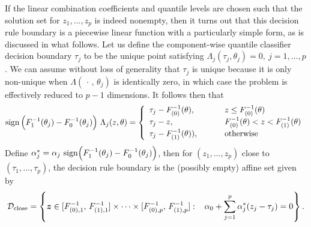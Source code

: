 If the linear combination coefficients and quantile levels are chosen such that
the solution set for $z_1, \dots, z_p$ is indeed nonempty, then it turns out
that this decision rule boundary is a piecewise linear function with a
particularly simple form, as is discussed in what follows.  Let us define the
component-wise quantile classifier decision boundary $\tau_j$ to be the unique
point satisfying $\Lambda_j (\tau_j, \theta_j) = 0,~ j = 1, \dots, p$.  We can
assume without loss of generality that $\tau_j$ is unique because it is only
non-unique when $\Lambda(\,\cdot\,,\, \theta_j)$ is identically zero, in which
case the problem is effectively reduced to $p - 1$ dimensions.  It follows then
that
\begin{equation}
  \label{eq:lambda}
  \sign\Big(F_1^{-1}(\theta_j) - F_0^{-1}(\theta_j)\Big)~ \Lambda_j(z, \theta) =
  \left\{
    \begin{array}{lll}
      \tau_j - F_{(0)}^{-1}(\theta),
      & \hspace{5mm}
      & z \leq F_{(0)}^{-1}(\theta) \\[0.5ex]
      \tau_j - z,
      & \hspace{5mm}
      & F_{(0)}^{-1}(\theta) < z < F_{(1)}^{-1}(\theta) \\[0.5ex]
      \tau_j - F_{(1)}^{-1} (\theta)),
      & \hspace{5mm}
      & \text{otherwise} \\
    \end{array}
  \right.
\end{equation}
Define
$\alpha_j^{*} = \alpha_j\, \operatorname{sign}\!\Big(F_1^{-1}(\theta_j) -
F_0^{-1}(\theta_j)\Big)$, then for $(z_1, \dots, z_p)$ close to
$(\tau_1, \dots, \tau_p)$, the decision rule boundary is the (possibly empty)
affine set given by
\begin{equation}
  \label{eq:composite-classifiers-close}
  \mathcal{D}_{{\scriptstyle \text{close}}} = \left\{
    \vec{z} \in [F_{(0),1}^{-1},\, F_{(1),1}^{-1}]
    \times \dots \times
    [F_{(0),p}^{-1},\, F_{(1),p}^{-1}] :
    \hspace{3mm}
    \alpha_0 + \sum_{j=1}^p \alpha_j^{*} (z_j - \tau_j) = 0
  \right\} .
\end{equation}
